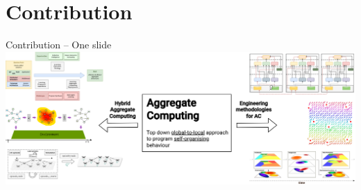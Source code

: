 \documentclass[presentation, 8pt,169]{beamer}\mode<presentation>{\usetheme{AMSBolognaFC}}
\begin{document}
\section{Contribution}
\begin{frame}{Contribution -- One slide}
\\[0.5cm]

\includegraphics[width=\textwidth]{img/contribution.drawio.png}
\end{frame}
\end{document}
